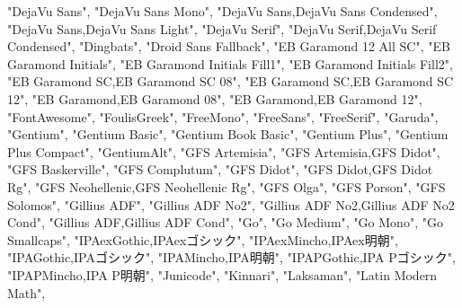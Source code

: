 \documentclass[
]{article}
\newenvironment{Shaded}{\begin{snugshade}}{\end{snugshade}}
\newcommand{\NormalTok}[1]{#1}
\newcommand{\StringTok}[1]{\textcolor[rgb]{0.31,0.60,0.02}{#1}}
\begin{document}
\begin{Shaded}
\begin{Highlighting}[]
  \StringTok{"DejaVu Sans"}\NormalTok{,}
  \StringTok{"DejaVu Sans Mono"}\NormalTok{,}
  \StringTok{"DejaVu Sans,DejaVu Sans Condensed"}\NormalTok{,}
  \StringTok{"DejaVu Sans,DejaVu Sans Light"}\NormalTok{,}
  \StringTok{"DejaVu Serif"}\NormalTok{,}
  \StringTok{"DejaVu Serif,DejaVu Serif Condensed"}\NormalTok{,}
  \StringTok{"Dingbats"}\NormalTok{,}
  \StringTok{"Droid Sans Fallback"}\NormalTok{,}
  \StringTok{"EB Garamond 12 All SC"}\NormalTok{,}
  \StringTok{"EB Garamond Initials"}\NormalTok{,}
  \StringTok{"EB Garamond Initials Fill1"}\NormalTok{,}
  \StringTok{"EB Garamond Initials Fill2"}\NormalTok{,}
  \StringTok{"EB Garamond SC,EB Garamond SC 08"}\NormalTok{,}
  \StringTok{"EB Garamond SC,EB Garamond SC 12"}\NormalTok{,}
  \StringTok{"EB Garamond,EB Garamond 08"}\NormalTok{,}
  \StringTok{"EB Garamond,EB Garamond 12"}\NormalTok{,}
  \StringTok{"FontAwesome"}\NormalTok{,}
  \StringTok{"FoulisGreek"}\NormalTok{,}
  \StringTok{"FreeMono"}\NormalTok{,}
  \StringTok{"FreeSans"}\NormalTok{,}
  \StringTok{"FreeSerif"}\NormalTok{,}
  \StringTok{"Garuda"}\NormalTok{,}
  \StringTok{"Gentium"}\NormalTok{,}
  \StringTok{"Gentium Basic"}\NormalTok{,}
  \StringTok{"Gentium Book Basic"}\NormalTok{,}
  \StringTok{"Gentium Plus"}\NormalTok{,}
  \StringTok{"Gentium Plus Compact"}\NormalTok{,}
  \StringTok{"GentiumAlt"}\NormalTok{,}
  \StringTok{"GFS Artemisia"}\NormalTok{,}
  \StringTok{"GFS Artemisia,GFS Didot"}\NormalTok{,}
  \StringTok{"GFS Baskerville"}\NormalTok{,}
  \StringTok{"GFS Complutum"}\NormalTok{,}
  \StringTok{"GFS Didot"}\NormalTok{,}
  \StringTok{"GFS Didot,GFS Didot Rg"}\NormalTok{,}
  \StringTok{"GFS Neohellenic,GFS Neohellenic Rg"}\NormalTok{,}
  \StringTok{"GFS Olga"}\NormalTok{,}
  \StringTok{"GFS Porson"}\NormalTok{,}
  \StringTok{"GFS Solomos"}\NormalTok{,}
  \StringTok{"Gillius ADF"}\NormalTok{,}
  \StringTok{"Gillius ADF No2"}\NormalTok{,}
  \StringTok{"Gillius ADF No2,Gillius ADF No2 Cond"}\NormalTok{,}
  \StringTok{"Gillius ADF,Gillius ADF Cond"}\NormalTok{,}
  \StringTok{"Go"}\NormalTok{,}
  \StringTok{"Go Medium"}\NormalTok{,}
  \StringTok{"Go Mono"}\NormalTok{,}
  \StringTok{"Go Smallcaps"}\NormalTok{,}
  \StringTok{"IPAexGothic,IPAexゴシック"}\NormalTok{,}
  \StringTok{"IPAexMincho,IPAex明朝"}\NormalTok{,}
  \StringTok{"IPAGothic,IPAゴシック"}\NormalTok{,}
  \StringTok{"IPAMincho,IPA明朝"}\NormalTok{,}
  \StringTok{"IPAPGothic,IPA Pゴシック"}\NormalTok{,}
  \StringTok{"IPAPMincho,IPA P明朝"}\NormalTok{,}
  \StringTok{"Junicode"}\NormalTok{,}
  \StringTok{"Kinnari"}\NormalTok{,}
  \StringTok{"Laksaman"}\NormalTok{,}
  \StringTok{"Latin Modern Math"}\NormalTok{,}

\end{Highlighting}
\end{Shaded}
\end{document}
